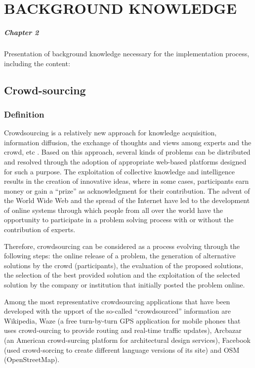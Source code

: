 \chapter{BACKGROUND KNOWLEDGE}
\label{chap:background}

\paragraph{Chapter 2} Presentation of background knowledge necessary for the implementation process, including the content:

\section{Crowd-sourcing}
\subsection{Definition}
Crowdsourcing is a relatively new approach for knowledge acquisition, information diffusion, the exchange of thoughts and views among experts and the crowd, etc \cite{futureinternet0600109}. Based on this approach, several kinds of problems can be distributed and resolved through the adoption of appropriate web-based platforms designed for such a purpose. The exploitation of collective knowledge and intelligence results in the creation of innovative ideas, where in some cases, participants earn money or gain a “prize” as acknowledgment for their contribution. The advent of the World Wide Web and the spread of the Internet have led to the development of online systems through which people from all over the world have the opportunity to participate in a problem solving process with or without the contribution of experts. 

Therefore, crowdsourcing can be considered as a process evolving through the following steps: the online release of a problem, the generation of alternative solutions by the crowd (participants), the evaluation of the proposed solutions, the selection of the best provided solution and the exploitation of the selected solution by the company or institution that initially posted the problem online.

 Among the most representative crowdsourcing applications that have been developed with the upport of the so-called “crowdsourced” information are Wikipedia, Waze (a free turn-by-turn GPS application for mobile phones that uses crowd-ourcing to provide routing and real-time traffic updates), Arcbazar (an American crowd-surcing platform for architectural design services), Facebook (used crowd-sorcing to create different language versions of its site) and OSM (OpenStreetMap).
 
